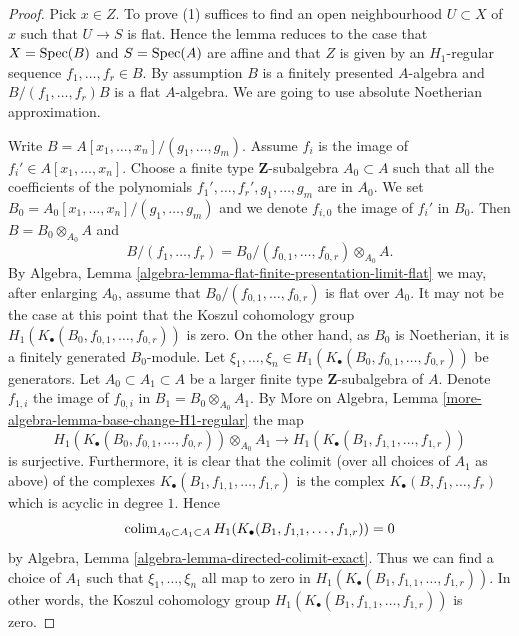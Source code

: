 \begin{proof}
Pick $x \in Z$. To prove (1) suffices to find an open neighbourhood
$U \subset X$ of $x$ such that $U \to S$ is flat. Hence the lemma reduces
to the case that $X = \mathop{\mathrm{Spec}}(B)$ and $S = \mathop{\mathrm{Spec}}(A)$ are affine
and that $Z$ is given by an $H_1$-regular sequence $f_1, \ldots, f_r \in B$.
By assumption $B$ is a finitely presented $A$-algebra and
$B/(f_1, \ldots, f_r)B$ is a flat $A$-algebra. We are going to use
absolute Noetherian approximation.

\medskip\noindent
Write $B = A[x_1, \ldots, x_n]/(g_1, \ldots, g_m)$. Assume
$f_i$ is the image of $f_i' \in A[x_1, \ldots, x_n]$. Choose a finite type
$\mathbf{Z}$-subalgebra $A_0 \subset A$ such that all the coefficients
of the polynomials $f_1', \ldots, f_r', g_1, \ldots, g_m$ are in $A_0$.
We set $B_0 = A_0[x_1, \ldots, x_n]/(g_1, \ldots, g_m)$ and we denote
$f_{i, 0}$ the image of $f_i'$ in $B_0$. Then $B = B_0 \otimes_{A_0} A$
and
$$
B/(f_1, \ldots, f_r) =
B_0/(f_{0, 1}, \ldots, f_{0, r}) \otimes_{A_0} A.
$$
By
Algebra, Lemma \ref{algebra-lemma-flat-finite-presentation-limit-flat}
we may, after enlarging $A_0$, assume that
$B_0/(f_{0, 1}, \ldots, f_{0, r})$ is flat over $A_0$.
It may not be the case at this point that the Koszul cohomology group
$H_1(K_\bullet(B_0, f_{0, 1}, \ldots, f_{0, r}))$ is zero.
On the other hand, as $B_0$ is Noetherian, it is a finitely
generated $B_0$-module. Let
$\xi_1, \ldots, \xi_n \in H_1(K_\bullet(B_0, f_{0, 1}, \ldots, f_{0, r}))$
be generators. Let $A_0 \subset A_1 \subset A$ be a larger finite type
$\mathbf{Z}$-subalgebra of $A$. Denote $f_{1, i}$ the image
of $f_{0, i}$ in $B_1 = B_0 \otimes_{A_0} A_1$. By
More on Algebra, Lemma \ref{more-algebra-lemma-base-change-H1-regular}
the map
$$
H_1(K_\bullet(B_0, f_{0, 1}, \ldots, f_{0, r})) \otimes_{A_0} A_1
\longrightarrow
H_1(K_\bullet(B_1, f_{1, 1}, \ldots, f_{1, r}))
$$
is surjective. Furthermore, it is clear that the colimit (over all
choices of $A_1$ as above) of the
complexes $K_\bullet(B_1, f_{1, 1}, \ldots, f_{1, r})$ is the complex
$K_\bullet(B, f_1, \ldots, f_r)$ which is acyclic in degree $1$. Hence
$$
\mathop{\mathrm{colim}}\nolimits_{A_0 \subset A_1 \subset A}
H_1(K_\bullet(B_1, f_{1, 1}, \ldots, f_{1, r}))
= 0
$$
by
Algebra, Lemma \ref{algebra-lemma-directed-colimit-exact}.
Thus we can find a choice of $A_1$ such that $\xi_1, \ldots, \xi_n$
all map to zero in $H_1(K_\bullet(B_1, f_{1, 1}, \ldots, f_{1, r}))$.
In other words, the Koszul cohomology group
$H_1(K_\bullet(B_1, f_{1, 1}, \ldots, f_{1, r}))$
is zero.


\end{proof}
